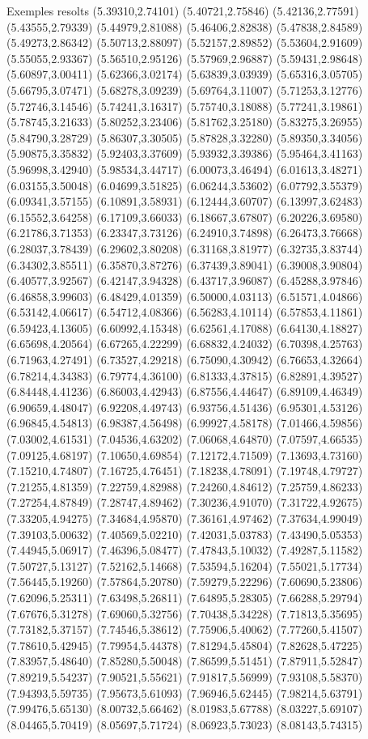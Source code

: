 \documentclass[11pt,a4paper]{article}
\begin{document}
\begin{fmex}{Exemples resolts}
(5.39310,2.74101) (5.40721,2.75846) (5.42136,2.77591) (5.43555,2.79339) (5.44979,2.81088) (5.46406,2.82838) (5.47838,2.84589) (5.49273,2.86342) (5.50713,2.88097) (5.52157,2.89852) (5.53604,2.91609) (5.55055,2.93367) (5.56510,2.95126) (5.57969,2.96887) (5.59431,2.98648) (5.60897,3.00411) (5.62366,3.02174) (5.63839,3.03939) (5.65316,3.05705) (5.66795,3.07471) (5.68278,3.09239) (5.69764,3.11007) (5.71253,3.12776) (5.72746,3.14546) (5.74241,3.16317) (5.75740,3.18088) (5.77241,3.19861) (5.78745,3.21633) (5.80252,3.23406) (5.81762,3.25180) (5.83275,3.26955) (5.84790,3.28729) (5.86307,3.30505) (5.87828,3.32280) (5.89350,3.34056) (5.90875,3.35832) (5.92403,3.37609) (5.93932,3.39386) (5.95464,3.41163) (5.96998,3.42940) (5.98534,3.44717) (6.00073,3.46494) (6.01613,3.48271) (6.03155,3.50048) (6.04699,3.51825) (6.06244,3.53602) (6.07792,3.55379) (6.09341,3.57155) (6.10891,3.58931) (6.12444,3.60707) (6.13997,3.62483) (6.15552,3.64258) (6.17109,3.66033) (6.18667,3.67807) (6.20226,3.69580) (6.21786,3.71353) (6.23347,3.73126) (6.24910,3.74898) (6.26473,3.76668) (6.28037,3.78439) (6.29602,3.80208) (6.31168,3.81977) (6.32735,3.83744) (6.34302,3.85511) (6.35870,3.87276) (6.37439,3.89041) (6.39008,3.90804) (6.40577,3.92567) (6.42147,3.94328) (6.43717,3.96087) (6.45288,3.97846) (6.46858,3.99603) (6.48429,4.01359) (6.50000,4.03113) (6.51571,4.04866) (6.53142,4.06617) (6.54712,4.08366) (6.56283,4.10114) (6.57853,4.11861) (6.59423,4.13605) (6.60992,4.15348) (6.62561,4.17088) (6.64130,4.18827) (6.65698,4.20564) (6.67265,4.22299) (6.68832,4.24032) (6.70398,4.25763) (6.71963,4.27491) (6.73527,4.29218) (6.75090,4.30942) (6.76653,4.32664) (6.78214,4.34383) (6.79774,4.36100) (6.81333,4.37815) (6.82891,4.39527) (6.84448,4.41236) (6.86003,4.42943) (6.87556,4.44647) (6.89109,4.46349) (6.90659,4.48047) (6.92208,4.49743) (6.93756,4.51436) (6.95301,4.53126) (6.96845,4.54813) (6.98387,4.56498) (6.99927,4.58178) (7.01466,4.59856) (7.03002,4.61531) (7.04536,4.63202) (7.06068,4.64870) (7.07597,4.66535) (7.09125,4.68197) (7.10650,4.69854) (7.12172,4.71509) (7.13693,4.73160) (7.15210,4.74807) (7.16725,4.76451) (7.18238,4.78091) (7.19748,4.79727) (7.21255,4.81359) (7.22759,4.82988) (7.24260,4.84612) (7.25759,4.86233) (7.27254,4.87849) (7.28747,4.89462) (7.30236,4.91070) (7.31722,4.92675) (7.33205,4.94275) (7.34684,4.95870) (7.36161,4.97462) (7.37634,4.99049) (7.39103,5.00632) (7.40569,5.02210) (7.42031,5.03783) (7.43490,5.05353) (7.44945,5.06917) (7.46396,5.08477) (7.47843,5.10032) (7.49287,5.11582) (7.50727,5.13127) (7.52162,5.14668) (7.53594,5.16204) (7.55021,5.17734) (7.56445,5.19260) (7.57864,5.20780) (7.59279,5.22296) (7.60690,5.23806) (7.62096,5.25311) (7.63498,5.26811) (7.64895,5.28305) (7.66288,5.29794) (7.67676,5.31278) (7.69060,5.32756) (7.70438,5.34228) (7.71813,5.35695) (7.73182,5.37157) (7.74546,5.38612) (7.75906,5.40062) (7.77260,5.41507) (7.78610,5.42945) (7.79954,5.44378) (7.81294,5.45804) (7.82628,5.47225) (7.83957,5.48640) (7.85280,5.50048) (7.86599,5.51451) (7.87911,5.52847) (7.89219,5.54237) (7.90521,5.55621) (7.91817,5.56999) (7.93108,5.58370) (7.94393,5.59735) (7.95673,5.61093) (7.96946,5.62445) (7.98214,5.63791) (7.99476,5.65130) (8.00732,5.66462) (8.01983,5.67788) (8.03227,5.69107) (8.04465,5.70419) (8.05697,5.71724) (8.06923,5.73023) (8.08143,5.74315) 
\end{fmex}
\end{document}
